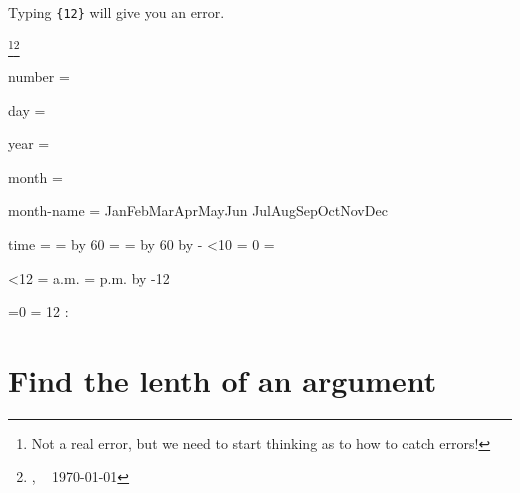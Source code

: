 Typing \texttt{\string\weekday\{12\}} will give you an error. 

\footnote{Not a real error, but we need to start thinking as to how to catch errors!}\footnote{\jobname, ~ \today }

\begin{teX}
\def\monthname{%
\ifcase\month
   \or Jan\or Feb\or Mar\or Apr\or May\or Jun%
   \or Jul\or Aug\or Sep\or Oct\or Nov\or Dec%
\fi
}%

\def\timestring{\begingroup
\count0 = \time \divide\count0 by 60
\count2 = \count0 %
\count4 = \time \multiply\count0 by 60
\advance\count4 by -\count0 %
\ifnum\count4<10 \toks1 = {0}%
\else \toks1 = {}%
\fi

\ifnum\count2<12 \toks0 = {a.m.}%
\else \toks0 = {p.m.}%
\advance\count2 by -12
\fi

\ifnum\count2=0 \count2 = 12 \fi 
\number\count2:\the\toks1 \number\count4
\thinspace \the\toks0
\endgroup}%

\def\timestamp{\number\day\space\monthname\space
\number\year\quad\timestring}%

number = \number

day = \day 

year =\year

month = \month

month-name  = \monthname 8

time = \timestring
\end{teX}

\section{Find the lenth of an argument}

